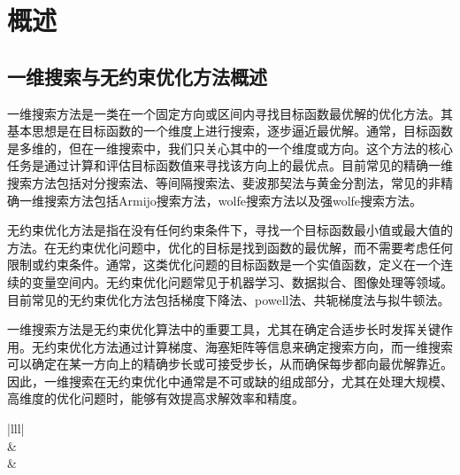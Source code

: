 \section{概述}

\subsection{一维搜索与无约束优化方法概述}

一维搜索方法是一类在一个固定方向或区间内寻找目标函数最优解的优化方法。其基本思想是在目标函数的一个维度上进行搜索，逐步逼近最优解。通常，目标函数是多维的，但在一维搜索中，我们只关心其中的一个维度或方向。这个方法的核心任务是通过计算和评估目标函数值来寻找该方向上的最优点。目前常见的精确一维搜索方法包括对分搜索法、等间隔搜索法、斐波那契法与黄金分割法，常见的非精确一维搜索方法包括Armijo搜索方法，wolfe搜索方法以及强wolfe搜索方法。

无约束优化方法是指在没有任何约束条件下，寻找一个目标函数最小值或最大值的方法。在无约束优化问题中，优化的目标是找到函数的最优解，而不需要考虑任何限制或约束条件。通常，这类优化问题的目标函数是一个实值函数，定义在一个连续的变量空间内。无约束优化问题常见于机器学习、数据拟合、图像处理等领域。目前常见的无约束优化方法包括梯度下降法、powell法、共轭梯度法与拟牛顿法。

一维搜索方法是无约束优化算法中的重要工具，尤其在确定合适步长时发挥关键作用。无约束优化方法通过计算梯度、海塞矩阵等信息来确定搜索方向，而一维搜索可以确定在某一方向上的精确步长或可接受步长，从而确保每步都向最优解靠近。因此，一维搜索在无约束优化中通常是不可或缺的组成部分，尤其在处理大规模、高维度的优化问题时，能够有效提高求解效率和精度。
\vspace{1cm}
\begin{table}[h]
\centering
\begin{tabular}{|lll|}
\hline
{}  \\ \hline
{}  &      \\ \hline
{} &  \\ \hline
{} \\ \hline
{}                                       \\ \hline
\end{tabular}
\caption{常见一维搜索与无约束优化方法}
\end{table}
